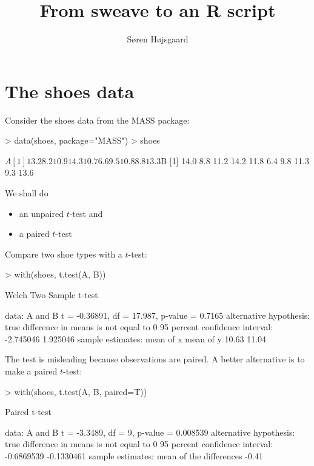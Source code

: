 \documentclass{article}
\title{From sweave to an R script}
\author{Søren Højsgaard}
\begin{document}
\maketitle

\section{The shoes data}

Consider the shoes data from the MASS package:

\begin{Schunk}
\begin{Sinput}
> data(shoes, package="MASS")
> shoes
\end{Sinput}
\begin{Soutput}
$A
 [1] 13.2  8.2 10.9 14.3 10.7  6.6  9.5 10.8  8.8 13.3

$B
 [1] 14.0  8.8 11.2 14.2 11.8  6.4  9.8 11.3  9.3 13.6
\end{Soutput}
\end{Schunk}


We shall do
\begin{itemize}
\item an unpaired $t$-test and
\item a paired $t$-test
\end{itemize}

Compare two shoe types with a $t$-test:

\begin{Schunk}
\begin{Sinput}
> with(shoes, t.test(A, B))
\end{Sinput}
\begin{Soutput}
	Welch Two Sample t-test

data:  A and B
t = -0.36891, df = 17.987, p-value = 0.7165
alternative hypothesis: true difference in means is not equal to 0
95 percent confidence interval:
 -2.745046  1.925046
sample estimates:
mean of x mean of y 
    10.63     11.04 
\end{Soutput}
\end{Schunk}

The test is misleading because observations are paired. A better
alternative is to make a paired $t$-test:

\begin{Schunk}
\begin{Sinput}
> with(shoes, t.test(A, B, paired=T))
\end{Sinput}
\begin{Soutput}
	Paired t-test

data:  A and B
t = -3.3489, df = 9, p-value = 0.008539
alternative hypothesis: true difference in means is not equal to 0
95 percent confidence interval:
 -0.6869539 -0.1330461
sample estimates:
mean of the differences 
                  -0.41 
\end{Soutput}
\end{Schunk}
\end{document}
